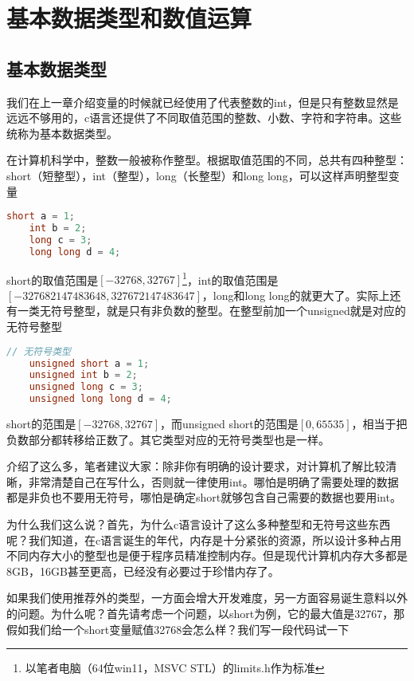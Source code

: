\section{基本数据类型和数值运算}

\subsection{基本数据类型}

我们在上一章介绍变量的时候就已经使用了代表整数的int，但是只有整数显然是远远不够用的，c语言还提供了不同取值范围的整数、小数、字符和字符串。这些统称为基本数据类型。

在计算机科学中，整数一般被称作整型。根据取值范围的不同，总共有四种整型：short（短整型），int（整型），long（长整型）和long long，可以这样声明整型变量

\begin{lstlisting}[language=C]
    short a = 1;
    int b = 2;
    long c = 3;
    long long d = 4;
\end{lstlisting}

short的取值范围是$[-32768, 32767]$\footnote{以笔者电脑（64位win11，MSVC STL）的limits.h作为标准}，int的取值范围是$[-327682147483648, 327672147483647]$，long和long long的就更大了。实际上还有一类无符号整型，就是只有非负数的整型。在整型前加一个unsigned就是对应的无符号整型

\begin{lstlisting}[language=C]
    // 无符号类型
    unsigned short a = 1;
    unsigned int b = 2;
    unsigned long c = 3;
    unsigned long long d = 4;
\end{lstlisting}

short的范围是$[-32768, 32767]$，而unsigned short的范围是$[0, 65535]$，相当于把负数部分都转移给正数了。其它类型对应的无符号类型也是一样。

介绍了这么多，笔者建议大家：除非你有明确的设计要求，对计算机了解比较清晰，非常清楚自己在写什么，否则就一律使用int。哪怕是明确了需要处理的数据都是非负也不要用无符号，哪怕是确定short就够包含自己需要的数据也要用int。

为什么我们这么说？首先，为什么c语言设计了这么多种整型和无符号这些东西呢？我们知道，在c语言诞生的年代，内存是十分紧张的资源，所以设计多种占用不同内存大小的整型也是便于程序员精准控制内存。但是现代计算机内存大多都是8GB，16GB甚至更高，已经没有必要过于珍惜内存了。

如果我们使用推荐外的类型，一方面会增大开发难度，另一方面容易诞生意料以外的问题。为什么呢？首先请考虑一个问题，以short为例，它的最大值是32767，那假如我们给一个short变量赋值32768会怎么样？我们写一段代码试一下

